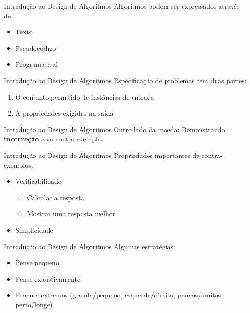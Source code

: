 \begin{frame}{Introdução ao Design de Algoritmos}
    \Large
    Algoritmos podem ser expressados através de:
    
    \begin{itemize}
        \item \Large Texto
        \item \Large Pseudocódigo
        \item \Large Programa real
    \end{itemize}
    
\end{frame}

\begin{frame}{Introdução ao Design de Algoritmos}
    \Large
    Especificação de problemas tem duas partes:
    
    \begin{enumerate}
        \item \Large O conjunto permitido de instâncias de entrada
        \item \Large A propriedades exigidas na saída
    \end{enumerate}
\end{frame}

\begin{frame}{Introdução ao Design de Algoritmos}
    \huge
    Outro lado da moeda: Demonstrando \textbf{incorreção} com contra-exemplos
\end{frame}

\begin{frame}{Introdução ao Design de Algoritmos}
    \Large Propriedades importantes de contra-exemplos:
    
    \begin{itemize}
        \item \Large Verificabilidade
        \begin{itemize}
            \Large
            \item Calcular a resposta
            \item Mostrar uma resposta melhor
        \end{itemize}
        \item \Large Simplicidade
    \end{itemize}
\end{frame}

\begin{frame}{Introdução ao Design de Algoritmos}
    \Large Algumas estratégias:
    
    \begin{itemize}
        \Large
        \item Pense pequeno
        \item Pense exaustivamente
        \item Procure extremos (grande/pequeno, esquerda/direita, poucos/muitos, perto/longe)
    \end{itemize}
\end{frame}
